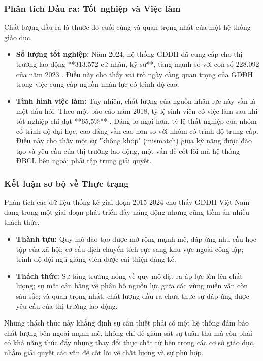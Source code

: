 \documentclass[12pt, a4paper, openany]{report}
\begin{document}
\subsubsection{Phân tích Đầu ra: Tốt nghiệp và Việc làm}

Chất lượng đầu ra là thước đo cuối cùng và quan trọng nhất của một hệ thống giáo dục.
\begin{itemize}
    \item \textbf{Số lượng tốt nghiệp:} Năm 2024, hệ thống GDĐH đã cung cấp cho thị trường lao động **313.572 cử nhân, kỹ sư**, tăng mạnh so với con số 228.092 của năm 2023 \cite{stat_moet_2024}. Điều này cho thấy vai trò ngày càng quan trọng của GDĐH trong việc cung cấp nguồn nhân lực có trình độ cao.
    \item \textbf{Tình hình việc làm:} Tuy nhiên, chất lượng của nguồn nhân lực này vẫn là một dấu hỏi. Theo một báo cáo năm 2018, tỷ lệ sinh viên có việc làm sau khi tốt nghiệp chỉ đạt **65,5\%** \cite{stat_that_nghiep_2018}. Đáng lo ngại hơn, tỷ lệ thất nghiệp của nhóm có trình độ đại học, cao đẳng vẫn cao hơn so với nhóm có trình độ trung cấp. Điều này cho thấy một sự "không khớp" (mismatch) giữa kỹ năng được đào tạo và yêu cầu của thị trường lao động, một vấn đề cốt lõi mà hệ thống ĐBCL bên ngoài phải tập trung giải quyết.
\end{itemize}

\subsubsection{Kết luận sơ bộ về Thực trạng}
Phân tích các dữ liệu thống kê giai đoạn 2015-2024 cho thấy GDĐH Việt Nam đang trong một giai đoạn phát triển đầy năng động nhưng cũng tiềm ẩn nhiều thách thức.
\begin{itemize}
    \item \textbf{Thành tựu:} Quy mô đào tạo được mở rộng mạnh mẽ, đáp ứng nhu cầu học tập của xã hội; cơ cấu dịch chuyển tích cực sang khu vực ngoài công lập; trình độ đội ngũ giảng viên được cải thiện đáng kể.
    \item \textbf{Thách thức:} Sự tăng trưởng nóng về quy mô đặt ra áp lực lớn lên chất lượng; sự mất cân bằng về phân bố nguồn lực giữa các vùng miền vẫn còn sâu sắc; và quan trọng nhất, chất lượng đầu ra chưa thực sự đáp ứng được yêu cầu của thị trường lao động.
\end{itemize}
Những thách thức này khẳng định sự cần thiết phải có một hệ thống đảm bảo chất lượng bên ngoài mạnh mẽ, không chỉ để giám sát sự tuân thủ mà còn phải có khả năng thúc đẩy những thay đổi thực chất từ bên trong các cơ sở giáo dục, nhằm giải quyết các vấn đề cốt lõi về chất lượng và sự phù hợp.
\end{document}
